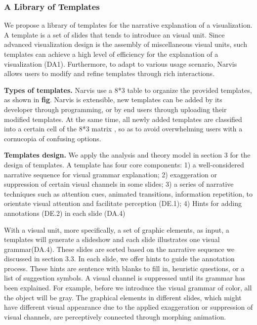 \subsubsection{A Library of Templates}
We propose a library of templates for the narrative explanation of a visualization. A template is a set of slides that tends to introduce an visual unit. Since advanced visualization design is the assembly of miscellaneous visual units, such templates can achieve a high level of efficiency for the explanation of a visualization (DA1). Furthermore, to adapt to various usage scenario, Narvis allows users to modify and refine templates through rich interactions.

\noindent
\textbf{Types of templates.}
Narvis use a 8*3  table to organize the provided templates, as shown in \textbf{fig}. Narvis is extensible, new templates can be added by its developer through programming, or by end users through uploading their modified templates. At the same time, all newly added templates are classified into a certain cell of the 8*3 matrix , so as to avoid overwhelming users with a cornucopia of confusing options.

\noindent
\textbf{Templates design.}
We apply the analysis and theory model in section 3  for the design of templates. A template has four core components: 1) a well-considered narrative sequence for visual grammar explanation; 2) exaggeration or suppression of certain visual channels in some slides; 3) a series of narrative techniques such as attention cues, animated transitions, information repetition, to orientate visual attention and facilitate perception (DE.1); 4) Hints for adding annotations (DE.2) in each slide (DA.4) 

With a visual unit, more specifically, a set of graphic elements, as input, a templates will generate a slideshow and each slide illustrates one visual grammar(DA.4).  These slides are sorted based on the narrative sequence we discussed in section 3.3. In each slide, we offer hints to guide the annotation process. These hints are sentence with blanks to fill in, heuristic questions, or a list of suggestion symbols. A visual channel is suppressed until its grammar has been explained. For example, before we introduce the visual grammar of color, all the object will be gray.  The graphical elements in different slides, which might have different visual appearance due to the applied exaggeration or suppression of visual channels, are perceptively connected through morphing animation. 

